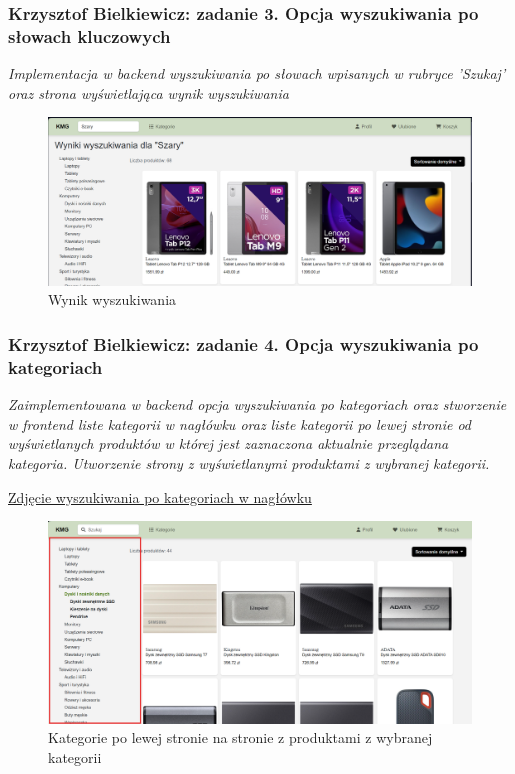 \documentclass[12pt,a4paper,oneside]{article}
\theoremstyle{definition}
\numberwithin{equation}{section}
\begin{document}
\subsubsection{Krzysztof Bielkiewicz: zadanie 3. Opcja wyszukiwania po słowach kluczowych}
\label{1.3.3}
\textit{Implementacja w backend wyszukiwania po słowach wpisanych w rubryce 'Szukaj'
oraz strona wyświetlająca wynik wyszukiwania}
\begin{figure}[H]
    \centering
    \includegraphics[width=0.8\columnwidth]{images/krzysztofBImages/wyszukiwanie.png}
    \caption{Wynik wyszukiwania}
    \label{search-value}
\end{figure}

    
\subsubsection{Krzysztof Bielkiewicz: zadanie 4. Opcja wyszukiwania po kategoriach}
\label{1.3.4}
    \textit{Zaimplementowana w backend opcja wyszukiwania po kategoriach
     oraz stworzenie w frontend liste kategorii w nagłówku
      oraz liste kategorii po lewej stronie od wyświetlanych produktów w której jest zaznaczona
      aktualnie przeglądana kategoria. Utworzenie strony z wyświetlanymi produktami z wybranej kategorii.}
    \begin{center}
        \hyperref[header-categories]{Zdjęcie wyszukiwania po kategoriach w nagłówku}
    \end{center}

    \begin{figure}[H]
        \centering
        \includegraphics[width=0.8\columnwidth]{images/krzysztofBImages/lewe-kategorie.png}
        \caption{Kategorie po lewej stronie na stronie z produktami z wybranej kategorii}
        \label{left-categories}
    \end{figure}
\end{document}
